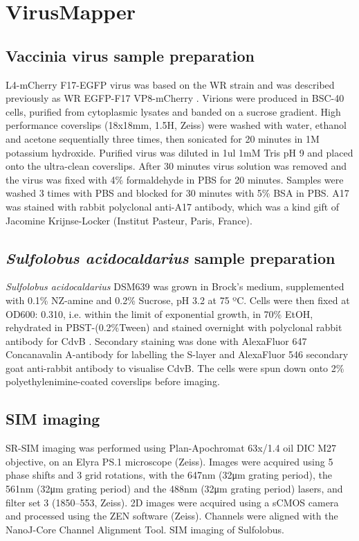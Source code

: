 \section{VirusMapper}

\subsection{Vaccinia virus sample preparation}
 
L4-mCherry F17-EGFP virus was based on the WR strain and was described previously as WR EGFP-F17 VP8-mCherry \cite{schmidt2013vaccinia}. Virions were produced in BSC-40 cells, purified from cytoplasmic lysates and banded on a sucrose gradient. High performance coverslips (18x18mm, 1.5H, Zeiss) were washed with water, ethanol and acetone sequentially three times, then sonicated for 20 minutes in 1M potassium hydroxide. Purified virus was diluted in 1ul 1mM Tris pH 9 and placed onto the ultra-clean coverslips. After 30 minutes virus solution was removed and the virus was fixed with 4\% formaldehyde in PBS for 20 minutes. Samples were washed 3 times with PBS and blocked for 30 minutes with 5\% BSA in PBS. A17 was stained with rabbit polyclonal anti-A17 antibody, which was a kind gift of Jacomine Krijnse-Locker (Institut Pasteur, Paris, France).

\subsection{\textit{Sulfolobus acidocaldarius} sample preparation}

\textit{Sulfolobus acidocaldarius} DSM639 was grown in Brock’s medium, supplemented with 0.1\% NZ-amine and 0.2\% Sucrose, pH 3.2 at 75 ºC. Cells were then fixed at OD600: 0.310, i.e. within the limit of exponential growth, in 70\% EtOH, rehydrated in PBST-(0.2\%Tween) and stained overnight with polyclonal rabbit antibody for CdvB \cite{Lindås et al, 2008}. Secondary staining was done with AlexaFluor 647 Concanavalin A-antibody for labelling the S-layer and AlexaFluor 546 secondary goat anti-rabbit antibody to visualise CdvB. The cells were spun down onto 2\% polyethylenimine-coated coverslips before imaging.
 
\subsection{SIM imaging}
 
SR-SIM imaging was performed using Plan-Apochromat 63x/1.4 oil DIC M27 objective, on an Elyra PS.1 microscope (Zeiss). Images were acquired using 5 phase shifts and 3 grid rotations, with the 647nm (32μm grating period), the 561nm (32μm grating period) and the 488nm (32μm grating period) lasers, and filter set 3 (1850–553, Zeiss). 2D images were acquired using a sCMOS camera and processed using the ZEN software (Zeiss). Channels were aligned with the NanoJ-Core Channel Alignment Tool. SIM imaging of Sulfolobus.

